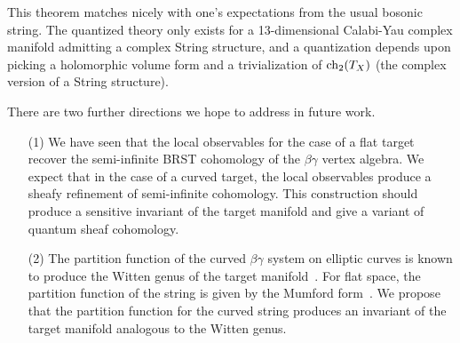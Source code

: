 This theorem matches nicely with one's expectations from the usual bosonic string.
The quantized theory only exists for a 13-dimensional Calabi-Yau complex manifold admitting a complex String structure,
and a quantization depends upon picking a holomorphic volume form and a trivialization of ${\rm ch}_2(T_X)$ (the complex version of a String structure).

There are two further directions we hope to address in future work.
\begin{itemize}
\item[(1)] We have seen that the local observables for the case of a flat target recover the semi-infinite BRST cohomology of the $\beta\gamma$ vertex algebra. 
We expect that in the case of a curved target, the local observables produce a sheafy refinement of semi-infinite cohomology. 
This construction should produce a sensitive invariant of the target manifold and give a variant of quantum sheaf cohomology. 
\item[(2)] The partition function of the curved $\beta\gamma$ system on elliptic curves is known to produce the Witten genus of the target manifold~\cite{wg2}. 
For flat space, the partition function of the string is given by the Mumford form~\cite{BM}. 
We propose that the partition function for the curved string produces an invariant of the target manifold analogous to the Witten genus. 
\end{itemize}
